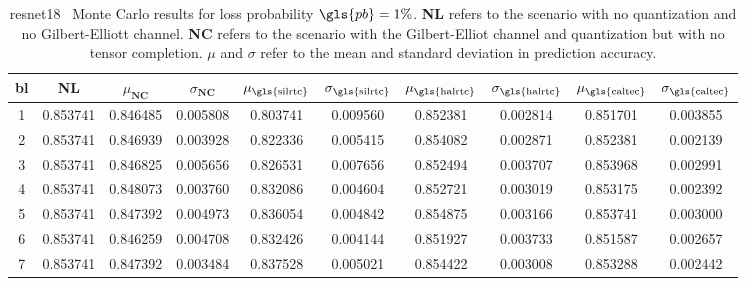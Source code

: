 \begin{table}[H]
	\caption[ResNet18 Monte Carlo results with 1\% loss probability]{\gls{resnet18} \addone~Monte Carlo results for loss probability $\gls{pb} = 1\%$. \textbf{NL} refers to the scenario with no quantization and no Gilbert-Elliott channel. \textbf{NC} refers to the scenario with the Gilbert-Elliot channel and quantization but with no tensor completion. $\mu$ and $\sigma$ refer to the mean and standard deviation in prediction accuracy.} \label{table:expts:mc:0.01}
	\centering
	\begin{adjustbox}{max width = \textwidth}
		\begin{tabular}{|c|c|cc|cc|cc|cc|}
			\hline
			\gls{bl} &  \textbf{NL} &  $\mu_{\textbf{NC}}$ &  $\sigma_{\textbf{NC}}$ &  $\mu_{\text{\gls{silrtc}}}$ &  $\sigma_{\text{\gls{silrtc}}}$ &  $\mu_{\text{\gls{halrtc}}}$ &  $\sigma_{\text{\gls{halrtc}}}$ &  $\mu_{\text{\gls{caltec}}}$ &  $\sigma_{\text{\gls{caltec}}}$ \\
			\hline \hline 
			1 &   0.853741 &             0.846485 &            0.005808 &     0.803741 &    0.009560 &   \cellcolor{green!25}  0.852381 &    0.002814 &     0.851701 &    0.003855 \\
			2 &   0.853741 &             0.846939 &            0.003928 &     0.822336 &    0.005415 &   \cellcolor{green!25}  0.854082 &    0.002871 &     0.852381 &    0.002139 \\
			3 &   0.853741 &             0.846825 &            0.005656 &     0.826531 &    0.007656 &     0.852494 &    0.003707 & \cellcolor{green!25}     0.853968 &    0.002991 \\
			4 &   0.853741 &             0.848073 &            0.003760 &     0.832086 &    0.004604 &     0.852721 &    0.003019 &  \cellcolor{green!25}   0.853175 &    0.002392 \\
			5 &   0.853741 &             0.847392 &            0.004973 &     0.836054 &    0.004842 &  \cellcolor{green!25}   0.854875 &    0.003166 &     0.853741 &    0.003000 \\
			6 &   0.853741 &             0.846259 &            0.004708 &     0.832426 &    0.004144 & \cellcolor{green!25}    0.851927 &    0.003733 &     0.851587 &    0.002657 \\
			7 &   0.853741 &             0.847392 &            0.003484 &     0.837528 &    0.005021 & \cellcolor{green!25}    0.854422 &    0.003008 &     0.853288 &    0.002442 \\
			\hline 
		\end{tabular}
	\end{adjustbox}
\end{table}


